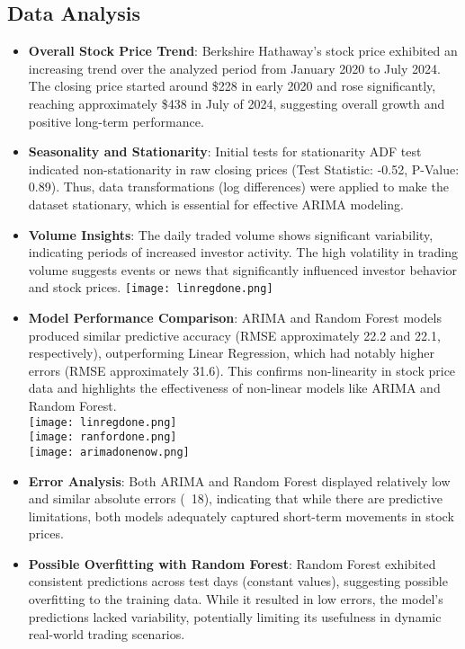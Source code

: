\documentclass[conference]{IEEEtran}
\begin{document}
\subsection{Data Analysis}\label{AA}
\begin{itemize}
    \item \textbf{Overall Stock Price Trend}: Berkshire Hathaway's stock price exhibited an increasing trend over the analyzed period from January 2020 to July 2024. The closing price started around \$228 in early 2020 and rose significantly, reaching approximately \$438 in July of 2024, suggesting overall growth and positive long-term performance.
    \item \textbf{Seasonality and Stationarity}: Initial tests for stationarity ADF test indicated non-stationarity in raw closing prices (Test Statistic: -0.52, P-Value: 0.89). Thus, data transformations (log differences) were applied to make the dataset stationary, which is essential for effective ARIMA modeling.
    \item \textbf{Volume Insights}: The daily traded volume shows significant variability, indicating periods of increased investor activity. The high volatility in trading volume suggests events or news that significantly influenced investor behavior and stock prices.
     \texttt{[image: linregdone.png]} %
    \item \textbf{Model Performance Comparison}: ARIMA and Random Forest models produced similar predictive accuracy (RMSE approximately 22.2 and 22.1, respectively), outperforming Linear Regression, which had notably higher errors (RMSE approximately 31.6). This confirms non-linearity in stock price data and highlights the effectiveness of non-linear models like ARIMA and Random Forest.
    \\
     \texttt{[image: linregdone.png]} %
     \\
      \texttt{[image: ranfordone.png]} %
    \\
       \texttt{[image: arimadonenow.png]} %
    \item \textbf{Error Analysis}: Both ARIMA and Random Forest displayed relatively low and similar absolute errors (~18), indicating that while there are predictive limitations, both models adequately captured short-term movements in stock prices.
    \item \textbf{Possible Overfitting with Random Forest}: Random Forest exhibited consistent predictions across test days (constant values), suggesting possible overfitting to the training data. While it resulted in low errors, the model’s predictions lacked variability, potentially limiting its usefulness in dynamic real-world trading scenarios.
\end{itemize}
\end{document}
